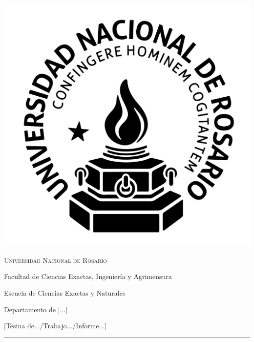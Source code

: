 \documentclass[12pt, spanish]{article}
\begin{document}
\begin{titlepage}
  \begin{center}
    \vspace{-1.5cm}

    \includegraphics[scale=0.09]{imagenes/Logounr.png}  
  \end{center}

  \begin{center}

    \vspace{-.1cm}

    \Large \textsc{Universidad Nacional de Rosario}
    
    \vspace{.2cm}
    
    \large{Facultad de Ciencias Exactas, Ingeniería y Agrimensura
    
    Escuela de Ciencias Exactas y Naturales
    
    Departamento de [...]}
  \end{center}

  \begin{center}
    
    \vfill
    {\Large [Tesina de.../Trabajo.../Informe...]}
    \vspace{1.5cm}
    
    \hrule
    \vspace{0.5cm}


\end{center}
\end{titlepage}
\end{document}
